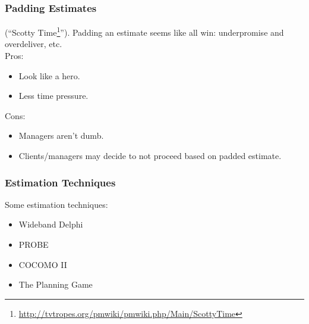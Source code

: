 \begin{frame}
\frametitle{Padding Estimates}

\begin{changemargin}{1cm}

(``Scotty Time\footnote{\url{http://tvtropes.org/pmwiki/pmwiki.php/Main/ScottyTime}}''). Padding an estimate seems like all win: underpromise and overdeliver, etc. \\[1em]


Pros:
\begin{itemize}
\item Look like a hero.
\item Less time pressure.
\end{itemize}

Cons:
\begin{itemize}
\item Managers aren't dumb.
\item Clients/managers may decide to not proceed based on padded estimate.
\end{itemize}

\end{changemargin}
\end{frame}

\begin{frame}

\frametitle{Estimation Techniques}

\large
\begin{changemargin}{1cm}

Some estimation techniques:

\begin{itemize}
\item Wideband Delphi
\item PROBE
\item COCOMO II
\item The Planning Game
\end{itemize}

\end{changemargin}
\end{frame}

